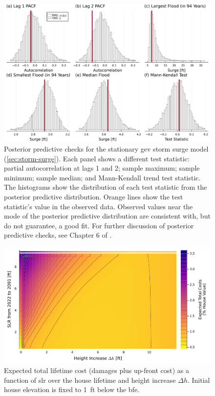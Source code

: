 \documentclass[12pt]{article}
\begin{document}
\begin{figure}
    \centering
    \includegraphics[width=\textwidth]{surge-test-statistics}
    \caption{
        Posterior predictive checks for the stationary \gls{gev} storm surge model (\cref{sec:storm-surge}).
        Each panel shows a different test statistic: partial autocorrelation at lags 1 and 2; sample maximum; sample minimum; sample median; and Mann-Kendall trend test statistic.
        The histograms show the distribution of each test statistic from the posterior predictive distribution.
        Orange lines show the test statistic's value in the observed data.
        Observed values near the mode of the posterior predictive distribution are consistent with, but do not guarantee, a good fit.
        For further discussion of posterior predictive checks, see Chapter 6 of \citet{Gelman:2014tc}.
    }\label{fig:surge-test-statistics}
\end{figure}

\begin{figure}
    \includegraphics[width=\textwidth]{scenario-map-height-slr}
    \caption{
        Expected total lifetime cost (damages plus up-front cost) as a function of \gls{slr} over the house lifetime and height increase $\Delta h$.
        Initial house elevation is fixed to \SI{1}{ft} below the \gls{bfe}.
    }\label{fig:scenario-map-height-slr}
\end{figure}
\end{document}
